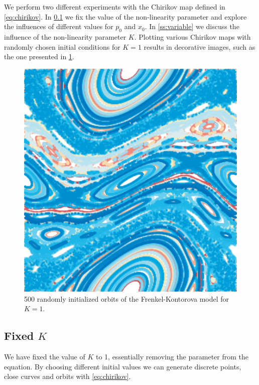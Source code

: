 We perform two different experiments with the Chirikov map defined in \cref{eq:chirikov}. In \cref{ss:fixed} we fix the value of the non-linearity parameter and explore the influences of different values for $p_0$ and $x_0$. In \cref{ss:variable} we discuss the influence of the non-linearity parameter $K$. Plotting various Chirikov maps with randomly chosen initial conditions for $K = 1$ results in decorative images, such as the one presented in \cref{fig:a:pretty}.

	\begin{figure}[b]
		\centering
		\includegraphics[width=0.9\columnwidth]{./img/assignment_a_pretty_low_res.pdf}
		\caption{500 randomly initialized orbits of the Frenkel-Kontorova model for $K = 1$.}
		\label{fig:a:pretty}
	\end{figure}

\subsection[]{Fixed $K$}
\label{ss:fixed}
	We have fixed the value of $K$ to 1, essentially removing the parameter from the equation. By choosing different initial values we can generate discrete points, close curves and orbits with \cref{eq:chirikov}.
	
